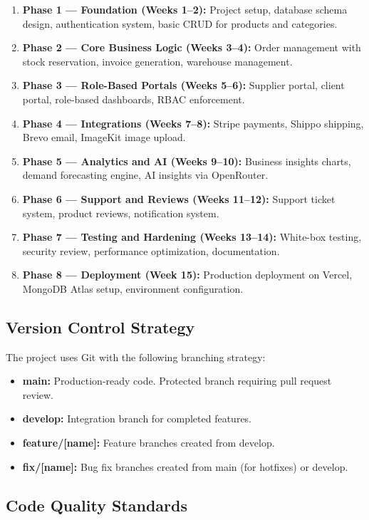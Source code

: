 \documentclass[12pt,onecolumn]{IEEEtran}
\begin{document}
\begin{enumerate}[leftmargin=1.5em]
  \item \textbf{Phase 1 --- Foundation (Weeks 1--2):} Project setup, database schema design, authentication system, basic CRUD for products and categories.
  \item \textbf{Phase 2 --- Core Business Logic (Weeks 3--4):} Order management with stock reservation, invoice generation, warehouse management.
  \item \textbf{Phase 3 --- Role-Based Portals (Weeks 5--6):} Supplier portal, client portal, role-based dashboards, RBAC enforcement.
  \item \textbf{Phase 4 --- Integrations (Weeks 7--8):} Stripe payments, Shippo shipping, Brevo email, ImageKit image upload.
  \item \textbf{Phase 5 --- Analytics and AI (Weeks 9--10):} Business insights charts, demand forecasting engine, AI insights via OpenRouter.
  \item \textbf{Phase 6 --- Support and Reviews (Weeks 11--12):} Support ticket system, product reviews, notification system.
  \item \textbf{Phase 7 --- Testing and Hardening (Weeks 13--14):} White-box testing, security review, performance optimization, documentation.
  \item \textbf{Phase 8 --- Deployment (Week 15):} Production deployment on Vercel, MongoDB Atlas setup, environment configuration.
\end{enumerate}

\subsection{Version Control Strategy}

The project uses Git with the following branching strategy:

\begin{itemize}[leftmargin=1.5em]
  \item \textbf{main:} Production-ready code. Protected branch requiring pull request review.
  \item \textbf{develop:} Integration branch for completed features.
  \item \textbf{feature/[name]:} Feature branches created from develop.
  \item \textbf{fix/[name]:} Bug fix branches created from main (for hotfixes) or develop.
\end{itemize}

\subsection{Code Quality Standards}
\end{document}

